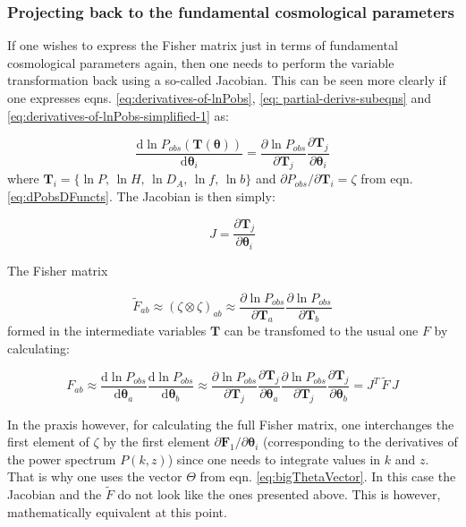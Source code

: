 \subsubsection{Projecting back to the fundamental cosmological parameters}

If one wishes to express the Fisher matrix just in terms of fundamental
cosmological parameters again, then one needs to perform the variable
transformation back using a so-called Jacobian. This can be seen more
clearly if one expresses eqns. \ref{eq:derivatives-of-lnPobs}, \ref{eq: partial-derivs-subeqns}
and \ref{eq:derivatives-of-lnPobs-simplified-1} as:

\begin{equation}
\frac{\mbox{d}\ln P_{obs}(\mathbf{T}(\boldsymbol{\theta}))}{\mbox{d}\boldsymbol{\theta}_{i}}=\frac{\partial\ln P_{obs}}{\partial\mathbf{T}{}_{j}}\frac{\partial\mathbf{T}_{j}}{\partial\boldsymbol{\theta}_{i}}
\end{equation}
where $\mathbf{T}_{i}=\{\ln P,\,\ln H,\,\ln D_{A},\,\ln f,\,\ln b\}$
and $\partial P_{obs}/\partial\mathbf{T}{}_{i}=\zeta$ from eqn. \ref{eq:dPobsDFuncts}.
The Jacobian is then simply: 

\begin{equation}
J=\frac{\partial\mathbf{T}_{j}}{\partial\boldsymbol{\theta}_{i}}\label{eq:jacobian}
\end{equation}


The Fisher matrix 

\begin{equation}
\tilde{F}_{ab}\approx(\zeta\otimes\zeta)_{ab}\approx\frac{\partial\ln P_{obs}}{\partial\mathbf{T}{}_{a}}\frac{\partial\ln P_{obs}}{\partial\mathbf{T}{}_{b}}
\end{equation}
formed in the intermediate variables $\boldsymbol{T}$ can be transfomed
to the usual one $F$ by calculating:

\begin{equation}
F_{ab}\approx\frac{\mbox{d}\ln P_{obs}}{\mbox{d}\boldsymbol{\theta}{}_{a}}\frac{\mbox{d}\ln P_{obs}}{\mbox{d}\boldsymbol{\theta}{}_{b}}\approx\frac{\partial\ln P_{obs}}{\partial\mathbf{T}{}_{j}}\frac{\partial\mathbf{T}_{j}}{\partial\boldsymbol{\theta}_{a}}\frac{\partial\ln P_{obs}}{\partial\mathbf{T}{}_{j}}\frac{\partial\mathbf{T}_{j}}{\partial\boldsymbol{\theta}_{b}}=J^{T}\,\tilde{F}\,J
\end{equation}


In the praxis however, for calculating the full Fisher matrix, one
interchanges the first element of $\zeta$ by the first element $\partial\boldsymbol{F}_{1}/\partial\boldsymbol{\theta}_{i}$
(corresponding to the derivatives of the power spectrum $P(k,z)$)
since one needs to integrate values in $k$ and $z$. That is why
one uses the vector $\Theta$ from eqn. \ref{eq:bigThetaVector}.
In this case the Jacobian and the $\tilde{F}$ do not look like the
ones presented above. This is however, mathematically equivalent at
this point.


